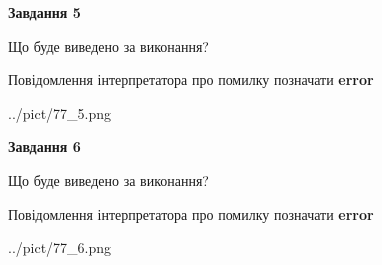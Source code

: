 \documentclass[12pt, ukrainian]{article}
\begin{document}
{{\begin {center}\textbf{Завдання 5}\end {center}}\par
Що буде виведено за виконання? \par
Повідомлення інтерпретатора про помилку позначати \textbf{error}

\begin{center}
	{../pict/77_5.png}
\end{center}
\newpage

{\begin {center}\textbf{Завдання 6}\end {center}}\par
Що буде виведено за виконання? \par
Повідомлення інтерпретатора про помилку позначати \textbf{error}

\begin{center}
	{../pict/77_6.png}
\end{center}
\newpage

}
\end{document}
